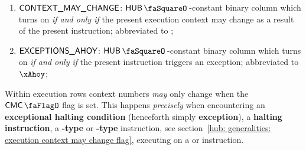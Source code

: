 \begin{enumerate}[resume]
	\item $\textsf{CONTEXT\_MAY\_CHANGE}$:
		$\hubStamp{}$-constant binary column which turns on \emph{if and only if} the present execution context may change as a result of the present instruction; abbreviated to \cmc{};
	\item $\textsf{EXCEPTIONS\_AHOY}$:
		$\hubStamp{}$-constant binary column which turns on \emph{if and only if} the present instruction triggers an exception; abbreviated to $\xAhoy$;
\end{enumerate}
Within execution rows context numbers \emph{may} only change when the $\cmc$ flag is set. This happens \emph{precisely} when encountering an \textbf{exceptional halting condition} (henceforth simply \textbf{exception}), a \textbf{halting instruction}, a \textbf{-type} or \textbf{-type} instruction, see section~\ref{hub: generalities: execution context may change flag}, executing on a  or  instruction.

